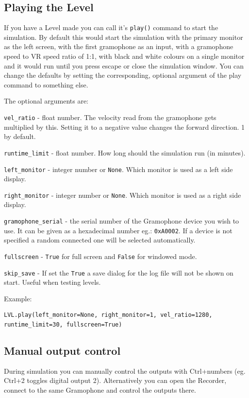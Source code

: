 \documentclass[11pt,a4paper]{article}
\newcommand{\param}[1]{\item \texttt{#1} -}
\begin{document}
\subsection{Playing the Level}
If you have a Level made you can call it's \texttt{play()} command to start the simulation. By default this would start the simulation with the primary monitor as the left screen, with the first gramophone as an input, with a gramophone speed to VR speed ratio of 1:1, with black and white colours on a single monitor and it would run until you press escape or close the simulation window. You can change the defaults by setting the corresponding, optional argument of the play command to something else.


The optional arguments are:
\begin{paramlist}

\param{vel\_ratio} float number. The velocity read from the gramophone gets multiplied by this. Setting it to a negative value changes the forward direction. 1 by default.
\param{runtime\_limit} float number. How long should the simulation run (in minutes).
\param{left\_monitor} integer number or \lstinline{None}. Which monitor is used as a left side display.
\param{right\_monitor} integer number or \lstinline{None}. Which monitor is used as a right side display.
\param{gramophone\_serial} the serial number of the Gramophone device you wish to use. It can be given as a hexadecimal number eg.: \lstinline{0xA0002}. If a device is not specified a random connected one will be selected automatically.
\param{fullscreen} \lstinline{True} for full screen and \lstinline{False} for windowed mode.
\param{skip\_save} If set the \lstinline{True} a save dialog for the log file will not be shown on start. Useful when testing levels.
\end{paramlist}


Example:

\begin{lstlisting}
LVL.play(left_monitor=None, right_monitor=1, vel_ratio=1280, runtime_limit=30, fullscreen=True)
\end{lstlisting}

\subsection{Manual output control}
During simulation you can manually control the outputs with Ctrl+numbers (eg. Ctrl+2 toggles digital output 2). Alternatively you can open the Recorder, connect to the same Gramophone and control the outputs there.
\end{document}
